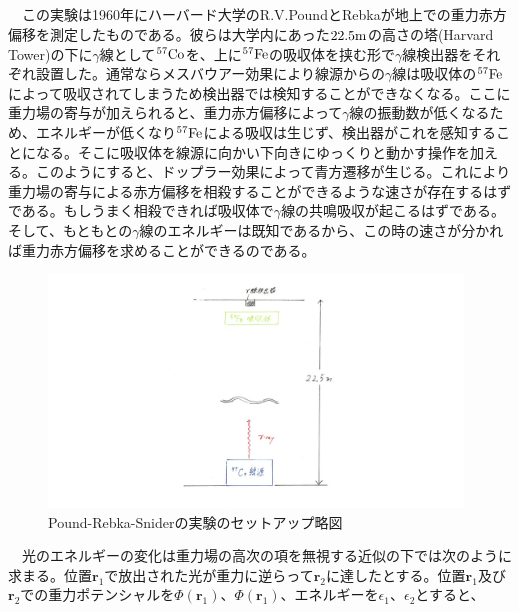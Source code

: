 \documentclass[a4j,fleqn]{jsarticle}
\begin{document}
        \subsection{}
        　この実験は1960年にハーバード大学のR.V.PoundとRebkaが地上での重力赤方偏移を測定したものである。彼らは大学内にあった$22.5{\rm{m}}$の高さの塔(Harvard Tower)の下に$\gamma$線として${}^{57}{\rm{Co}}$を、上に${}^{57}{\rm{Fe}}$の吸収体を挟む形で$\gamma$線検出器をそれぞれ設置した。通常ならメスバウアー効果により線源からの$\gamma$線は吸収体の${}^{57}{\rm{Fe}}$によって吸収されてしまうため検出器では検知することができなくなる。ここに重力場の寄与が加えられると、重力赤方偏移によって$\gamma$線の振動数が低くなるため、エネルギーが低くなり${}^{57}{\rm{Fe}}$による吸収は生じず、検出器がこれを感知することになる。そこに吸収体を線源に向かい下向きにゆっくりと動かす操作を加える。このようにすると、ドップラー効果によって青方遷移が生じる。これにより重力場の寄与による赤方偏移を相殺することができるような速さが存在するはずである。もしうまく相殺できれば吸収体で$\gamma$線の共鳴吸収が起こるはずである。そして、もともとの$\gamma$線のエネルギーは既知であるから、この時の速さが分かれば重力赤方偏移を求めることができるのである。
        \begin{figure}[H]
            \centering
            \includegraphics[bb= 0 0 900 550, width=11.0cm]{tamu_fig05.png}
            \caption{Pound-Rebka-Sniderの実験のセットアップ略図}
        \end{figure}
        　光のエネルギーの変化は重力場の高次の項を無視する近似の下では次のように求まる。位置$\bm{r}_1$で放出された光が重力に逆らって$\bm{r}_2$に達したとする。位置$\bm{r}_1$及び$\bm{r}_2$での重力ポテンシャルを$\Phi\left(\bm{r}_1\right)$、$\Phi\left(\bm{r}_1\right)$、エネルギーを$\epsilon_{1}$、$\epsilon_{2}$とすると、
\end{document}
